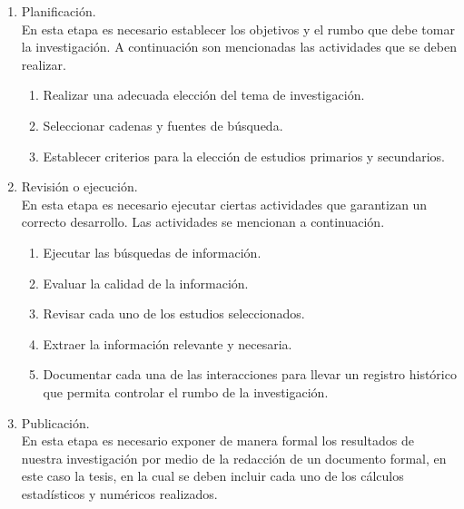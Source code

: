 \documentclass[runningheads,a4paper]{llncs}
\begin{document}
\begin{enumerate}
\item Planificación.\\ 

En esta etapa es necesario establecer los objetivos y el rumbo que debe tomar la investigación. A continuación son mencionadas las actividades que se deben realizar.\\

	\begin{enumerate}
		\item Realizar una adecuada elección del tema de investigación.
		\item Seleccionar cadenas y fuentes de búsqueda.
		\item Establecer criterios para la elección de estudios primarios y secundarios.\\
		
	\end{enumerate}
\item Revisión o ejecución.\\

En esta etapa es necesario ejecutar ciertas actividades que garantizan un correcto desarrollo. Las actividades se mencionan a continuación.

	\begin{enumerate}
		\item Ejecutar las búsquedas de información.
		\item Evaluar la calidad de la información.
		\item Revisar cada uno de los estudios seleccionados.
		\item Extraer la información relevante y necesaria.
		\item Documentar cada una de las interacciones para llevar un registro histórico que permita controlar el rumbo de la investigación.\\
		
	\end{enumerate}
\item Publicación.\\

En esta etapa es necesario exponer de manera formal los resultados de nuestra investigación por medio de la redacción de un documento formal, en este caso la tesis, en la cual se deben incluir cada uno de los cálculos estadísticos y numéricos realizados.
 
\end{enumerate}
\end{document}
